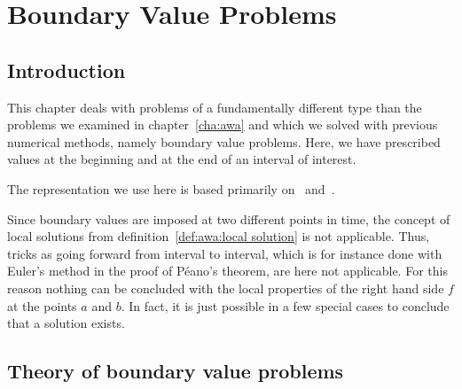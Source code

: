 \chapter{Boundary Value Problems}
\label{chapter:rwa}
\section{Introduction}
\begin{intro}
  This chapter deals with problems of a fundamentally different type
  than the problems we examined in chapter~\ref{cha:awa} and which we
  solved with previous numerical methods, namely boundary value
  problems. Here, we have prescribed values at the beginning and at
  the end of an interval of interest.

  The representation we use here is based primarily
  on~\cite{DeuflhardBornemann08} and~\cite{Rannacher12}.
\end{intro}




\begin{remark}
  Since boundary values are imposed at two different
  points in time, the concept of local solutions from
  definition~\ref{def:awa:local solution} is not applicable.
  Thus, tricks as going forward from interval to interval, which is
  for instance done with Euler's method in the proof of Péano's
  theorem, are here not applicable.  For this reason nothing can be
  concluded with the local properties of the right hand side $f$ at
  the points $a$ and $b$. In fact, it is just possible in a few
  special cases to conclude that a solution exists.
\end{remark}


\section{Theory of boundary value problems}

